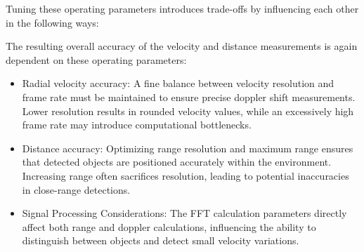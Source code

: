 Tuning these operating parameters introduces trade-offs by influencing each other in the following ways:
\begin{table}[h]
    \centering
    \caption{Radar System Tuning Parameters and Trade-offs}
    \label{tab:mmWave_Sensor_Parameters}
\end{table}
The resulting overall accuracy of the velocity and distance measurements is again dependent on these operating parameters:
\begin{itemize}
    \item Radial velocity accuracy: A fine balance between velocity resolution and frame rate must be maintained to ensure precise doppler shift measurements. Lower resolution results in rounded velocity values, while an excessively high frame rate may introduce computational bottlenecks.
    \item Distance accuracy: Optimizing range resolution and maximum range ensures that detected objects are positioned accurately within the environment. Increasing range often sacrifices resolution, leading to potential inaccuracies in close-range detections.
    \item Signal Processing Considerations: The FFT calculation parameters directly affect both range and doppler calculations, influencing the ability to distinguish between objects and detect small velocity variations.
\end{itemize}
